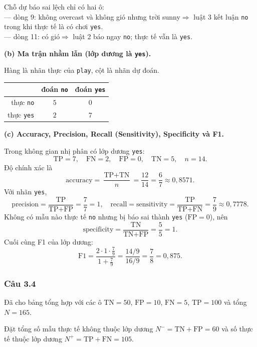 Chỗ dự báo sai lệch chỉ có hai ô:\\
--- dòng 9: không overcast và không gió nhưng trời sunny$ \Rightarrow $ luật 3 kết luận \texttt{no} trong khi thực tế là có chơi \texttt{yes}.\\
--- dòng 11: có gió$ \Rightarrow $ luật 2 báo ngay \texttt{no}; thực tế vẫn là \texttt{yes}.

\medskip
\textbf{(b) Ma trận nhầm lẫn (lớp dương là \texttt{yes}).}

Hàng là nhãn thực của \texttt{play}, cột là nhãn dự đoán.

\begin{center}
\small
\begin{tabular}{r|cc}
{} & đoán \texttt{no} & đoán \texttt{yes} \\
\hline
thực \texttt{no} & $5$ & $0$ \\
thực \texttt{yes} & $2$ & $7$ \\
\end{tabular}
\end{center}

\textbf{(c) Accuracy, Precision, Recall (Sensitivity), Specificity và F1.}

Trong không gian nhị phân có lớp dương \texttt{yes}:
\[
\text{TP}=7,\quad \text{FN}=2,\quad \text{FP}=0,\quad \text{TN}=5,\quad n=14.
\]
Độ chính xác là
\[
\text{accuracy}=\frac{\text{TP}+\text{TN}}{n}=\frac{12}{14}=\frac{6}{7}\approx 0{,}8571.
\]
Với nhãn \texttt{yes},
\[
\text{precision}=\frac{\text{TP}}{\text{TP}+\text{FP}}=\frac{7}{7}=1,\quad
\text{recall}=\text{sensitivity}=\frac{\text{TP}}{\text{TP}+\text{FN}}=\frac{7}{9}\approx 0{,}7778.
\]
Không có mẫu nào thực tế \texttt{no} nhưng bị báo sai thành \texttt{yes} ($\mathrm{FP}=0$), nên
\[
\text{specificity}=\frac{\text{TN}}{\text{TN}+\text{FP}}=\frac{5}{5}=1.
\]
Cuối cùng F1 của lớp dương:
\[
\text{F1}=\frac{2\cdot 1\cdot \frac79}{1+\frac79}=\frac{14/9}{16/9}=\frac{7}{8}=0{,}875.
\]

\subsubsection*{Câu 3.4}

Đã cho bảng tổng hợp với các ô $\text{TN}=50$, $\text{FP}=10$, $\text{FN}=5$, $\text{TP}=100$ và tổng $N=165$.

Đặt tổng số mẫu thực tế không thuộc lớp dương $N^-=\text{TN}+\text{FP}=60$ và số thực tế thuộc lớp dương $N^+=\text{TP}+\text{FN}=105$.

